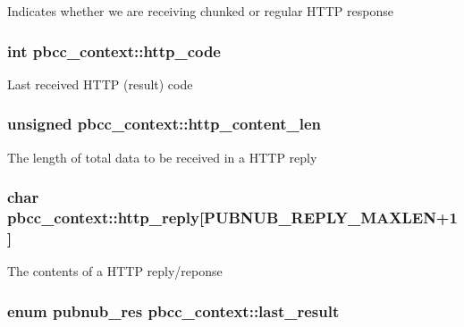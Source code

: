 Indicates whether we are receiving chunked or regular H\-T\-T\-P response \hypertarget{structpbcc__context_ad659b41ee54df86b38d74e6f5478c509}{
\subsubsection[{http\-\_\-code}]{\setlength{\rightskip}{0pt plus 5cm}int pbcc\-\_\-context\-::http\-\_\-code}}\label{structpbcc__context_ad659b41ee54df86b38d74e6f5478c509}
Last received H\-T\-T\-P (result) code \hypertarget{structpbcc__context_a971e2aac4ff3d79bdf592fb2ef10ff6b}{
\subsubsection[{http\-\_\-content\-\_\-len}]{\setlength{\rightskip}{0pt plus 5cm}unsigned pbcc\-\_\-context\-::http\-\_\-content\-\_\-len}}\label{structpbcc__context_a971e2aac4ff3d79bdf592fb2ef10ff6b}
The length of total data to be received in a H\-T\-T\-P reply \hypertarget{structpbcc__context_a80e82b122487ea9bb2713e3aee00fcc8}{
\subsubsection[{http\-\_\-reply}]{\setlength{\rightskip}{0pt plus 5cm}char pbcc\-\_\-context\-::http\-\_\-reply\mbox{[}P\-U\-B\-N\-U\-B\-\_\-\-R\-E\-P\-L\-Y\-\_\-\-M\-A\-X\-L\-E\-N+1\mbox{]}}}\label{structpbcc__context_a80e82b122487ea9bb2713e3aee00fcc8}
The contents of a H\-T\-T\-P reply/reponse \hypertarget{structpbcc__context_a0856b6491ba45151606f0aaf3b4682cb}{
\subsubsection[{last\-\_\-result}]{\setlength{\rightskip}{0pt plus 5cm}enum pubnub\-\_\-res pbcc\-\_\-context\-::last\-\_\-result}}\label{structpbcc__context_a0856b6491ba45151606f0aaf3b4682cb}
